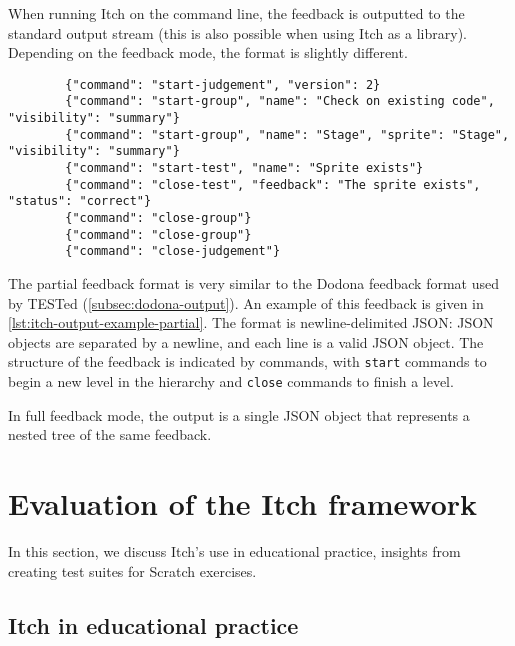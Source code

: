 \documentclass[../main]{subfiles}
\begin{document}
When running Itch on the command line, the feedback is outputted to the standard output stream (this is also possible when using Itch as a library).
Depending on the feedback mode, the format is slightly different.

\begin{listing}
    \begin{verbatim}
        {"command": "start-judgement", "version": 2}
        {"command": "start-group", "name": "Check on existing code", "visibility": "summary"}
        {"command": "start-group", "name": "Stage", "sprite": "Stage", "visibility": "summary"}
        {"command": "start-test", "name": "Sprite exists"}
        {"command": "close-test", "feedback": "The sprite exists", "status": "correct"}
        {"command": "close-group"}
        {"command": "close-group"}
        {"command": "close-judgement"}
    \end{verbatim}
    \caption{Example of the output generated by Itch for a test suite with two nested groups, with one test. Note the similarity to \cref{lst:tested-output-example}.}\label{lst:itch-output-example-partial}
\end{listing}

The partial feedback format is very similar to the Dodona feedback format used by TESTed (\cref{subsec:dodona-output}).
An example of this feedback is given in \cref{lst:itch-output-example-partial}.
The format is newline-delimited JSON: JSON objects are separated by a newline, and each line is a valid JSON object.
The structure of the feedback is indicated by commands, with \texttt{start} commands to begin a new level in the hierarchy and \texttt{close} commands to finish a level.

In full feedback mode, the output is a single JSON object that represents a nested tree of the same feedback.

\section{Evaluation of the Itch framework}\label{sec:itch-evaluation}

In this section, we discuss Itch's use in educational practice, insights from creating test suites for Scratch exercises.

\subsection{Itch in educational practice}\label{subsec:itch-in-educational-practice}
\end{document}
